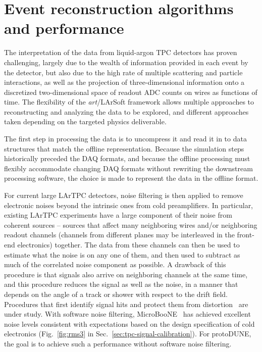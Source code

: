 \section{Event reconstruction algorithms and performance}
\label{sec:larsoftreco}

The interpretation of the data from liquid-argon TPC detectors has
proven challenging, largely due to the wealth of information provided
in each event by the detector, but also due to the high rate of
multiple scattering and particle interactions, as well as the
projection of three-dimensional information onto a discretized
two-dimensional space of readout ADC counts on wires as functions of
time.  The flexibility of the {\it{art}}/LArSoft framework allows
multiple approaches to reconstructing and analyzing the data to be
explored, and different approaches taken depending on the targeted
physics deliverable.

The first step in processing the data is to uncompress it and read it
in to data structures that match the offline representation.  Because
the simulation steps historically preceded the DAQ formats, and
because the offline processing must flexibly accommodate changing DAQ
formats without rewriting the downstream processing software, the
choice is made to represent the data in the offline format.


For current large LArTPC detectors, noise filtering is then applied to remove
electronic noises beyond the intrinsic ones from cold preamplifiers.
In particular, existing LArTPC experiments have a
large component of their noise from coherent sources -- sources that
affect many neighboring wires and/or neighboring readout channels
(channels from different planes may be interleaved in the front-end
electronics) together.  The data from these channels can then be used
to estimate what the noise is on any one of them, and then used to
subtract as much of the correlated noise component as possible.  A
drawback of this procedure is that signals also arrive on neighboring
channels at the same time, and this procedure reduces the signal as
well as the noise, in a manner that depends on the angle of a track or
shower with respect to the drift field.  Procedures that first
identify signal hits and protect them from distortion~\cite{microboone_noise} 
are under study. With software noise filtering, MicroBooNE~\cite{noise_filter}
has achieved excellent noise levels consistent with expectations based on 
the design specification of cold electronics (Fig.~\ref{fig:rms3} in Sec.~\ref{sec:tpc-signal-calibration}).
For protoDUNE, the goal is to achieve such a performance without 
software noise filtering. 

